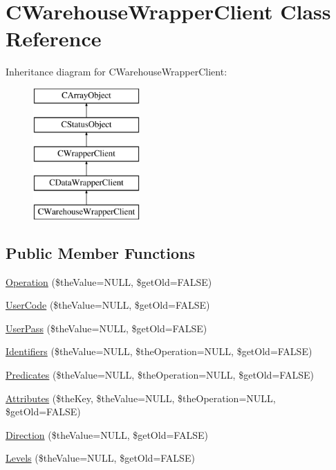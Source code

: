 \hypertarget{class_c_warehouse_wrapper_client}{\section{C\-Warehouse\-Wrapper\-Client Class Reference}
\label{class_c_warehouse_wrapper_client}
}
Inheritance diagram for C\-Warehouse\-Wrapper\-Client\-:\begin{figure}[H]
\begin{center}
\leavevmode
\includegraphics[height=5.000000cm]{class_c_warehouse_wrapper_client}
\end{center}
\end{figure}
\subsection*{Public Member Functions}
\begin{DoxyCompactItemize}
\item 
\hyperlink{class_c_warehouse_wrapper_client_a099ef5aef1883aa5b394c7086a818496}{Operation} (\$the\-Value=N\-U\-L\-L, \$get\-Old=F\-A\-L\-S\-E)
\item 
\hyperlink{class_c_warehouse_wrapper_client_ac953bbdc9dd6ccffa7ddfb8f59bbaf26}{User\-Code} (\$the\-Value=N\-U\-L\-L, \$get\-Old=F\-A\-L\-S\-E)
\item 
\hyperlink{class_c_warehouse_wrapper_client_a60e22139d7af5c828dcac8098e16ec6a}{User\-Pass} (\$the\-Value=N\-U\-L\-L, \$get\-Old=F\-A\-L\-S\-E)
\item 
\hyperlink{class_c_warehouse_wrapper_client_a39a624769f7cd1aebca73e7ba2c042e2}{Identifiers} (\$the\-Value=N\-U\-L\-L, \$the\-Operation=N\-U\-L\-L, \$get\-Old=F\-A\-L\-S\-E)
\item 
\hyperlink{class_c_warehouse_wrapper_client_a13557a813d85e638d97b729a27631af7}{Predicates} (\$the\-Value=N\-U\-L\-L, \$the\-Operation=N\-U\-L\-L, \$get\-Old=F\-A\-L\-S\-E)
\item 
\hyperlink{class_c_warehouse_wrapper_client_a5550bc094adb0dda32ce32979d4b70b7}{Attributes} (\$the\-Key, \$the\-Value=N\-U\-L\-L, \$the\-Operation=N\-U\-L\-L, \$get\-Old=F\-A\-L\-S\-E)
\item 
\hyperlink{class_c_warehouse_wrapper_client_a74a9e226190002542c67c64e766b91cd}{Direction} (\$the\-Value=N\-U\-L\-L, \$get\-Old=F\-A\-L\-S\-E)
\item 
\hyperlink{class_c_warehouse_wrapper_client_a858974f6dedaa731da4fe26664a21ab7}{Levels} (\$the\-Value=N\-U\-L\-L, \$get\-Old=F\-A\-L\-S\-E)
\end{DoxyCompactItemize}


